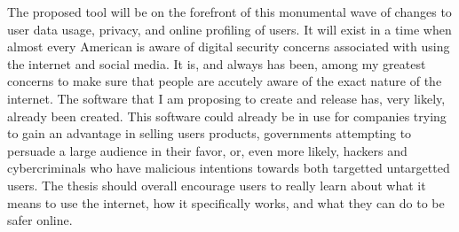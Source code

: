 \documentclass[11pt]{article}
\begin{document}
The proposed tool will be on the forefront of this monumental wave of changes to user data usage, privacy, and online profiling of users. It will exist in a time when almost every American is aware of digital security concerns associated with using the internet and social media. It is, and always has been, among my greatest concerns to make sure that people are accutely aware of the exact nature of the internet. The software that I am proposing to create and release has, very likely, already been created. This software could already be in use for companies trying to gain an advantage in selling users products, governments attempting to persuade a large audience in their favor, or, even more likely, hackers and cybercriminals who have malicious intentions towards both targetted untargetted users. The thesis should overall encourage users to really learn about what it means to use the internet, how it specifically works, and what they can do to be safer online.



\end{document}
